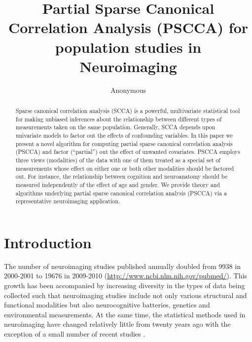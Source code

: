 \documentclass{llncs}
\begin{document}
\vspace{-0.1in}
\title{Partial Sparse Canonical Correlation Analysis (PSCCA) for population
  studies in Neuroimaging}
\author{Anonymous}
\maketitle              
\begin{abstract}
Sparse canonical correlation analysis (SCCA) is a powerful,
multivariate statistical tool for making unbiased inferences about the
relationship between different types of measurements taken on the same
population. Generally, SCCA depends upon univariate models to
factor out the effects of confounding variables.  In this paper we present a
novel algorithm for computing partial sparse canonical correlation
analysis (PSCCA) and factor (``partial'') out the effect of unwanted covariates. PSCCA employs
three views (modalities) of the data with one of them treated as a special set of
measurements whose effect on either  one or both other modalities should be factored out.  For instance, the relationship between
cognition and neuroanatomy should be measured independently of the
effect of age and gender.  We provide  theory and algorithms underlying partial sparse
canonical correlation analysis (PSCCA) via a representative neuroimaging
application.  
\end{abstract}
\section{Introduction}
The number of neuroimaging studies published annually doubled from
9938 in 2000-2001 to 19676 in 2009-2010
(\url{http://www.ncbi.nlm.nih.gov/pubmed/}).  This growth has been
accompanied by increasing diversity in the types of data being
collected such that neuroimaging studies include not only various
structural and functional modalities but also neurocognitive
batteries, genetics and environmental measurements.  At the same
time, the statistical methods used in neuroimaging have changed
relatively little from twenty years ago with the exception of a small
number of recent studies \cite{Tosun2010a}.
\end{document}
